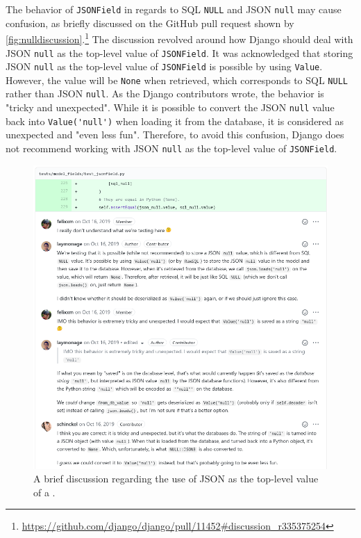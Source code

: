 The behavior of \verb|JSONField| in regards to SQL \verb|NULL| and JSON
\verb|null| may cause confusion, as briefly discussed on the GitHub pull
request shown by
\autoref{fig:nulldiscussion}.\footnote{\url{
	https://github.com/django/django/pull/11452\#discussion\_r335375254}}
The discussion revolved around how Django should deal with JSON \verb|null| as
the top-level value of \verb|JSONField|. It was acknowledged that storing JSON
\verb|null| as the top-level value of \verb|JSONField| is possible by using
\verb|Value|. However, the value will be \verb|None| when retrieved, which
corresponds to SQL \verb|NULL| rather than JSON \verb|null|. As the Django
contributors wrote, the behavior is "tricky and unexpected". While it is
possible to convert the JSON \verb|null| value back into \verb|Value('null')|
when loading it from the database, it is considered as unexpected and "even
less fun". Therefore, to avoid this confusion, Django does not recommend
working with JSON \verb|null| as the top-level value of \verb|JSONField|.

\begin{figure}
	\centering
    \includegraphics[width=1.0\textwidth]{pics/null_discussion.png}
	\caption{A brief discussion regarding the use of JSON  as the
	top-level value of a .}
	\label{fig:nulldiscussion}
\end{figure}

